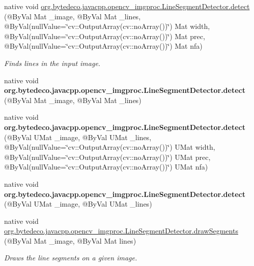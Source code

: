 \begin{DoxyCompactItemize}
\item 
native void \hyperlink{group__imgproc_gae1e811b637738b2c10d97ca72abcf5d0}{org.\+bytedeco.\+javacpp.\+opencv\+\_\+imgproc.\+Line\+Segment\+Detector.\+detect} (@By\+Val Mat \+\_\+image, @By\+Val Mat \+\_\+lines, @By\+Val(null\+Value=\char`\"{}cv\+::\+Output\+Array(cv\+::no\+Array())\char`\"{}) Mat width, @By\+Val(null\+Value=\char`\"{}cv\+::\+Output\+Array(cv\+::no\+Array())\char`\"{}) Mat prec, @By\+Val(null\+Value=\char`\"{}cv\+::\+Output\+Array(cv\+::no\+Array())\char`\"{}) Mat nfa)
\begin{DoxyCompactList}\small\item\em Finds lines in the input image. \end{DoxyCompactList}\item 
\mbox{\label{group__imgproc_ga596514aab3f36af17e1c8d134d8d54e4}} 
native void {\bfseries org.\+bytedeco.\+javacpp.\+opencv\+\_\+imgproc.\+Line\+Segment\+Detector.\+detect} (@By\+Val Mat \+\_\+image, @By\+Val Mat \+\_\+lines)
\item 
\mbox{\label{group__imgproc_gac0682f51450a19b1de0831f20cd7a290}} 
native void {\bfseries org.\+bytedeco.\+javacpp.\+opencv\+\_\+imgproc.\+Line\+Segment\+Detector.\+detect} (@By\+Val U\+Mat \+\_\+image, @By\+Val U\+Mat \+\_\+lines, @By\+Val(null\+Value=\char`\"{}cv\+::\+Output\+Array(cv\+::no\+Array())\char`\"{}) U\+Mat width, @By\+Val(null\+Value=\char`\"{}cv\+::\+Output\+Array(cv\+::no\+Array())\char`\"{}) U\+Mat prec, @By\+Val(null\+Value=\char`\"{}cv\+::\+Output\+Array(cv\+::no\+Array())\char`\"{}) U\+Mat nfa)
\item 
\mbox{\label{group__imgproc_ga1f4d914e7f3774f7874877a90bf6f6f7}} 
native void {\bfseries org.\+bytedeco.\+javacpp.\+opencv\+\_\+imgproc.\+Line\+Segment\+Detector.\+detect} (@By\+Val U\+Mat \+\_\+image, @By\+Val U\+Mat \+\_\+lines)
\item 
native void \hyperlink{group__imgproc_ga4034942c41526e2380675e1c0441d63c}{org.\+bytedeco.\+javacpp.\+opencv\+\_\+imgproc.\+Line\+Segment\+Detector.\+draw\+Segments} (@By\+Val Mat \+\_\+image, @By\+Val Mat lines)
\begin{DoxyCompactList}\small\item\em Draws the line segments on a given image. \end{DoxyCompactList}\item 
\mbox{\label{group__imgproc_ga677c9fc59ec637c5ad166d91a2f81d3f}} 

\end{DoxyCompactItemize}
